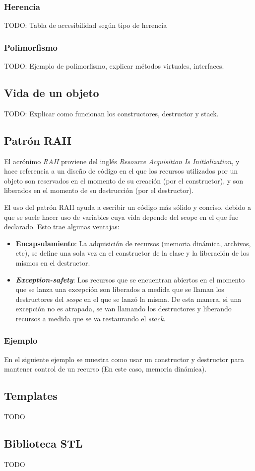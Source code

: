 \documentclass[oneside]{article}
\begin{document}
		\subsubsection{Herencia}
		TODO: Tabla de accesibilidad según tipo de herencia %
		\subsubsection{Polimorfismo}
		TODO: Ejemplo de polimorfismo, explicar métodos virtuales, interfaces. %

	\subsection{Vida de un objeto}
	TODO: Explicar como funcionan los constructores, destructor y stack.

	\subsection{Patrón RAII}
	El acrónimo \emph{RAII} proviene del inglés \emph{Resource Acquisition Is Initialization}, y hace referencia a un diseño de código en el que los recursos utilizados por un objeto son reservados en el momento de su creación (por el constructor), y son liberados en el momento de su destrucción (por el destructor).

	El uso del patrón RAII ayuda a escribir un código más sólido y conciso, debido a que se suele hacer uso de variables cuya vida depende del scope en el que fue declarado. Esto trae algunas ventajas:
	\begin{itemize}
		\item \textbf{Encapsulamiento}: La adquisición de recursos (memoria dinámica, archivos, etc), se define una sola vez en el constructor de la clase y la liberación de los mismos en el destructor.
		\item \emph{\textbf{Exception-safety}}: Los recursos que se encuentran abiertos en el momento que se lanza una excepción son liberados a medida que se llaman los destructores del \emph{scope} en el que se lanzó la misma. De esta manera, si una excepción no es atrapada, se van llamando los destructores y liberando recursos a medida que se va restaurando el \emph{stack}.
	\end{itemize}

\pagebreak

	\subsubsection{Ejemplo}
		En el siguiente ejemplo se muestra como usar un constructor y destructor para mantener control de un recurso (En este caso, memoria dinámica).
		

	\subsection{Templates}
	TODO %

	\subsection{Biblioteca STL}
	TODO %
\end{document}
